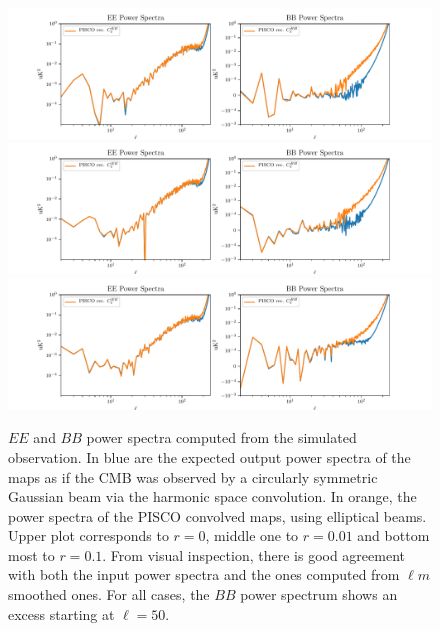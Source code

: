 \documentclass[a4paper,11pt]{article}
\begin{document}
%	

\begin{figure}
	\centering
	\includegraphics[width=1.0\linewidth]{figures/CLASS_scan_7_20_elliptical_gussian_beams_r_0d00.pdf}
	\includegraphics[width=1.0\linewidth]{figures/CLASS_scan_7_20_elliptical_gussian_beams_r_0d01.pdf}
	\includegraphics[width=1.0\linewidth]{figures/CLASS_scan_7_20_elliptical_gussian_beams_r_0d10.pdf}
	\caption{$EE$ and $BB$ power spectra computed from the simulated observation. In blue are the expected output power spectra of the maps as if the CMB was observed by a circularly symmetric Gaussian beam via the harmonic space convolution. In orange, the power spectra of the PISCO convolved maps, using elliptical beams. Upper plot corresponds to $r=0$, middle one to $r=0.01$ and bottom most to $r=0.1$. From visual inspection, there is good agreement with both the input power spectra and the ones computed from $\ell m$ smoothed ones. For all cases, the $BB$ power spectrum shows an excess starting at $\ell = 50$.}
	\label{fig::piscoclasssim}
\end{figure}
\end{document}
